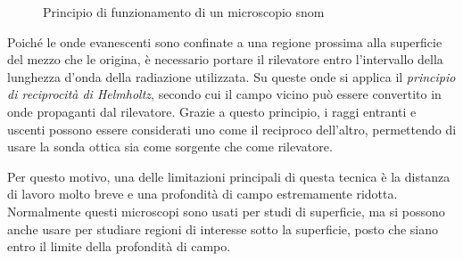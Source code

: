 \documentclass[../main.tex]{subfiles}
\begin{document}
\begin{figure}[h]
	\centering
	\caption[Principio di funzionamento di un microscopio SNOM]{
		Principio di funzionamento di un microscopio \acrshort{snom}}
	\label{fig:asnom_diag}
\end{figure}

Poiché le onde evanescenti sono confinate a una regione prossima alla superficie del mezzo che le origina, è necessario portare il rilevatore entro l'intervallo della lunghezza d'onda della radiazione utilizzata. Su queste onde si applica il \textit{principio di reciprocità di Helmholtz}, secondo cui il campo vicino può essere convertito in onde propaganti dal rilevatore. Grazie a questo principio, i raggi entranti e uscenti possono essere considerati uno come il reciproco dell'altro, permettendo di usare la sonda ottica sia come sorgente che come rilevatore.\cite{hapke_1993}

Per questo motivo, una delle limitazioni principali di questa tecnica è la distanza di lavoro molto breve e una profondità di campo estremamente ridotta. Normalmente questi microscopi sono usati per studi di superficie, ma si possono anche usare per studiare regioni di interesse sotto la superficie, posto che siano entro il limite della profondità di campo.\cite{vobornik_2008}
\end{document}

